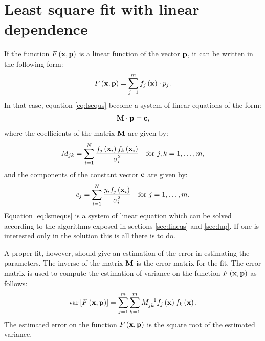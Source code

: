 \section{Least square fit with linear dependence}
\label{eq:lslinear} If the function $F\left({\textbf x},{\textbf
p}\right)$ is a linear function of the vector ${\textbf p}$, it can be
written in the following form:
\begin{equation}
  F\left({\textbf x},{\textbf p}\right)=\sum_{j=1}^m f_j\left({\textbf
  x}\right)\cdot p_j.
\end{equation}
In that case, equation \ref{eq:lsequs} become a system of linear
equations of the form:
\begin{equation}
\label{eq:lsmequs}
{\textbf M}\cdot{\textbf p}={\textbf c},
\end{equation}
where the coefficients of the matrix ${\textbf M}$ are given by:
\begin{equation}
  M_{jk}=\sum_{i=1}^N {\displaystyle f_j\left({\textbf x}_i\right)f_k\left({\textbf x}_i\right)
  \over\displaystyle \sigma_i^2}\mbox{\quad for $j,k=1,\ldots,m$},
\end{equation}
and the components of the constant vector ${\textbf c}$ are given by:
\begin{equation}
  c_j=\sum_{i=1}^N {\displaystyle y_if_j\left({\textbf x}_i\right)
  \over\displaystyle \sigma_i^2}\mbox{\quad for $j=1,\ldots,m$}.
\end{equation}
Equation \ref{eq:lsmequs} is a system of linear equation which can
be solved according to the algorithms exposed in sections
\ref{sec:lineqs} and \ref{sec:lup}. If one is interested only in
the solution this is all there is to do.

A proper fit, however, should give an estimation of the error in
estimating the parameters. The inverse of the matrix ${\textbf M}$ is
the error matrix for the fit. The error matrix is used to compute
the estimation of variance on the function $F\left({\textbf x},{\textbf
p}\right)$ as follows:
\begin{equation}
\label{eq:fitError}
  \mathop{\textrm{var}}\left[F\left({\textbf x},{\textbf p}\right)\right]=\sum_{j=1}^m \sum_{k=1}^m
  M_{jk}^{-1}f_j\left({\textbf x}\right)f_k\left({\textbf x}\right).
\end{equation}
The estimated error on the function $F\left({\textbf x},{\textbf
p}\right)$ is the square root of the estimated variance.

